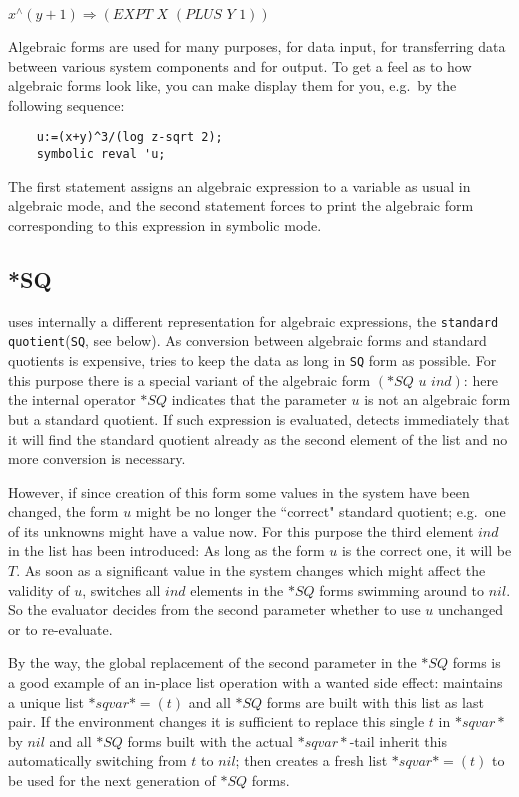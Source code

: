 $x^\wedge (y+1) \Rightarrow (EXPT\,\, X\,\, (PLUS\,\, Y\,\, 1))$

Algebraic forms are used for many purposes, for data input,
for transferring data between various system components and
for output. To get a feel as to how algebraic forms look
like, you can make {\reduce} display them for you, e.g.\  
by the following sequence:

\begin{verbatim}
    u:=(x+y)^3/(log z-sqrt 2);
    symbolic reval 'u;
\end{verbatim}

The first statement assigns an algebraic expression to a
variable as usual in algebraic mode, and the second statement
forces {\reduce} to print the algebraic form corresponding
to this expression in symbolic mode.


\subsection{*SQ}

{\reduce} uses internally a different
representation for algebraic expressions, the
{\tt standard quotient}({\tt SQ},
see below). As conversion
between algebraic forms and standard quotients is expensive,
{\reduce} tries to keep the data as long in {\tt SQ} 
form as possible. For this purpose there is a special
variant of the algebraic form $(*SQ \,\,  u \,\, ind)$: here the
internal operator $*SQ$ indicates that the parameter $u$
is not an algebraic form but a standard quotient. If such
expression is evaluated, {\reduce} detects
immediately that it will find the standard quotient
already as the second element of the list and no more
conversion is necessary. 

However, if since creation of this
form some values in the system have been changed, the
form $u$ might be no longer the ``correct" standard
quotient; e.g.\  one of its unknowns might have a value
now. For this purpose the third element $ind$ in the list
has been introduced: As long as the form $u$ is the correct
one, it will be $T$. As soon as a significant value in the
system changes which might affect the validity of $u$,
{\reduce} switches all $ind$ elements in the $*SQ$ forms
swimming around to $nil$. So the evaluator decides from the
second parameter whether to use $u$ unchanged or 
to re-evaluate.

By the way, the global replacement of the second parameter
in the $*SQ$ forms is a good example of an in-place
list operation with a wanted side effect:
{\reduce} maintains a unique  list $*sqvar*=(t)$ and all
$*SQ$ forms are built with this list as last pair.
If the environment changes it is sufficient to replace
this single {\bf $t$} in $*sqvar*$ by $nil$ and all $*SQ$ forms 
built with the actual $*sqvar*$-tail inherit this
automatically switching from $t$ to $nil$; 
{\reduce} then creates a fresh list $*sqvar*=(t)$
to be used for the next generation of $*SQ$ forms.


